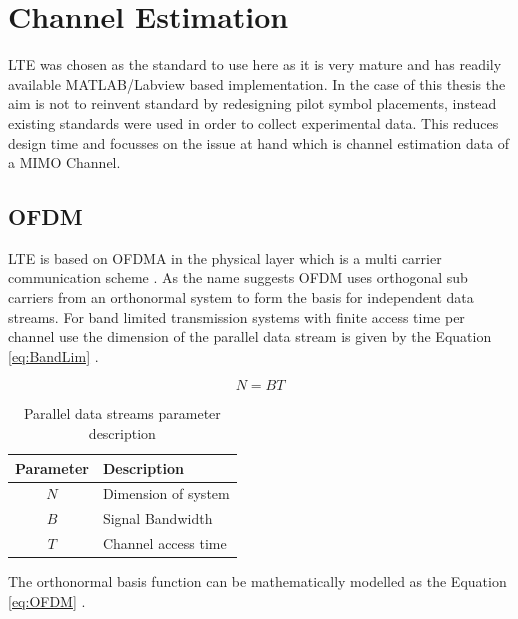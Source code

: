 \chapter{Channel Estimation}\label{ch:ChEst}

LTE was chosen as the standard to use here as it is very mature and has readily available MATLAB/Labview based implementation. In the case of this thesis the aim is not to reinvent standard by redesigning pilot symbol placements, instead existing standards were used in order to collect experimental data. This reduces design time and focusses on the issue at hand which is channel estimation data of a MIMO Channel.

\section{OFDM}\label{sec:OFDM}
LTE is based on OFDMA in the physical layer which is a multi carrier communication scheme \cite{FazelKaiser}. As the name suggests OFDM uses orthogonal sub carriers from an orthonormal system to form the basis for independent data streams. For band limited transmission systems with finite access time per channel use the dimension of the parallel data stream is given by the Equation \ref{eq:BandLim}  \cite{UtschickOFDM}.

        \begin{equation} \label{eq:BandLim}
            N = BT
        \end{equation}

        \begin{table}[H]
            \begin{center}
                \begin{tabular}{|c|l|}
                    \hline
                    Parameter& Description\\ \hline
                    $N$& Dimension of system \\ \hline
                    $B$& Signal Bandwidth \\ \hline
                    $T$& Channel access time \\
                    \hline
                \end{tabular}
                \caption{Parallel data streams parameter description}
                \label{tab:BandLimTrans}
            \end{center}
        \end{table}

The orthonormal basis function can be mathematically modelled as the Equation \ref{eq:OFDM} \cite{UtschickOFDM}.

